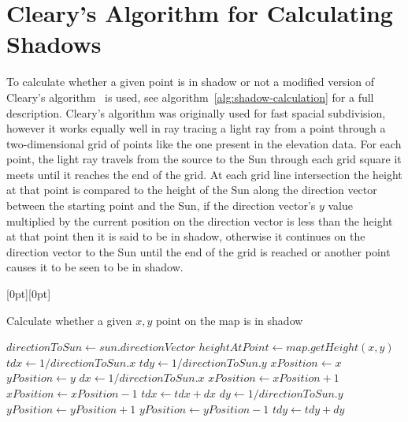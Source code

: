 \documentclass[12pt]{report}
\newcommand{\note}[1]{\raisebox{0pt}[0pt][0pt]{\pdfcomment[open=true]{#1}}}
\begin{document}
\section{Cleary's Algorithm for Calculating Shadows}
To calculate whether a given point is in shadow or not a modified version of Cleary's algorithm~\cite{cleary} is used, see algorithm~\ref{alg:shadow-calculation} for a full description. Cleary's algorithm was originally used for fast spacial subdivision, however it works equally well in ray tracing a light ray from a point through a two-dimensional grid of points like the one present in the elevation data. For each point, the light ray travels from the source to the Sun through each grid square it meets until it reaches the end of the grid. At each grid line intersection the height at that point is compared to the height of the Sun along the direction vector between the starting point and the Sun, if the direction vector's $y$ value multiplied by the current position on the direction vector is less than the height at that point then it is said to be in shadow, otherwise it continues on the direction vector to the Sun until the end of the grid is reached or another point causes it to be seen to be in shadow.

\begin{algorithm}[h]
\note{I have no idea how to make this look better}
\caption{Calculate whether a given $x,y$ point on the map is in shadow}
\label{alg:shadow-calculation}%
\begin{algorithmic}           %
\STATE $\mathit{directionToSun} \leftarrow \mathit{sun}.\mathit{directionVector}$
\STATE $\mathit{heightAtPoint} \leftarrow \mathit{map}.\mathit{getHeight}(x,y)$
\STATE $\mathit{tdx} \leftarrow 1 / \mathit{directionToSun}.x$
\STATE $\mathit{tdy} \leftarrow 1 / \mathit{directionToSun}.y$
\STATE $\mathit{xPosition} \leftarrow x$
\STATE $\mathit{yPosition} \leftarrow y$
	\ENDIF
		\STATE $dx \leftarrow 1 / \mathit{directionToSun}.x$
			\STATE $\mathit{xPosition} \leftarrow \mathit{xPosition} + 1$	
		\ELSE
			\STATE $\mathit{xPosition} \leftarrow \mathit{xPosition} - 1$	
		\ENDIF
		\STATE $tdx \leftarrow tdx + dx$
	\ELSE
		\STATE $dy \leftarrow 1 / \mathit{directionToSun}.y$
			\STATE $\mathit{yPosition} \leftarrow \mathit{yPosition} + 1$	
		\ELSE
			\STATE $\mathit{yPosition} \leftarrow \mathit{yPosition} - 1$	
		\ENDIF
		\STATE $tdy \leftarrow tdy + dy$		
	\ENDIF
\ENDWHILE
{}
\end{algorithmic}
\end{algorithm}
\end{document}
